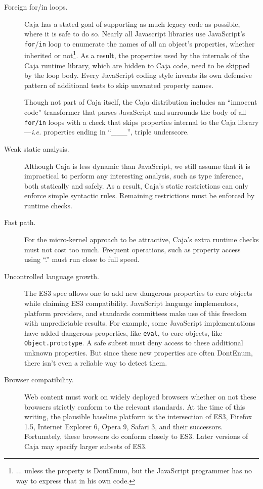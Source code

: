 \documentclass[letterpaper,twocolumn,10pt]{article}
\newcommand{\code}[1]{{\tt {#1}}}              %
\begin{document}
\begin{description}
  \item[Foreign for/in loops.] Caja has a stated goal of supporting as much legacy code as possible, where it
  is safe to do so.  Nearly all Javascript libraries use JavaScript's \code{for}/\code{in} loop to enumerate the names of all an object's 
  properties, whether inherited or not\footnote{
  ... unless the property is DontEnum, but the JavaScript programmer has no way to express that in his own code.
  }. As a result, the properties used by the internals of the Caja runtime library, which are hidden to Caja code, 
  need to be skipped by the loop body. Every JavaScript coding style invents its own defensive pattern of additional 
  tests to skip unwanted property names.
  
  Though not part of Caja itself, the Caja distribution includes an ``innocent code'' transformer that parses JavaScript and
  surrounds the body of all \code{for/in} loops with a check that skips properties internal to the Caja library---\emph{i.e.}
  properties ending in ``\_\_\_'', triple underscore.
    
  \item[Weak static analysis.] Although Caja is less dynamic than JavaScript, we still assume that it is impractical 
  to perform any interesting analysis, such as type inference, both statically and safely. As a result, Caja's static 
  restrictions can only enforce simple syntactic rules. Remaining restrictions must be enforced by runtime checks.
  
  \item[Fast path.] For the micro-kernel approach to be attractive, Caja's extra runtime checks must not cost too 
  much. Frequent operations, such as property access using ``.'' must run close to full speed.
  
  \item[Uncontrolled language growth.] The ES3 spec allows one to add new dangerous properties to core objects while 
  claiming ES3 compatibility. JavaScript language implementors, platform providers, and standards committees make use 
  of this freedom with unpredictable results. For example, some JavaScript implementations have added dangerous 
  properties, like \code{eval}, to core objects, like \code{Object.prototype}. A safe subset must deny access to 
  these additional unknown properties. But since these new properties are often DontEnum, there isn't even a reliable 
  way to detect them.
  
  \item[Browser compatibility.] Web content must work on widely deployed browsers whether on not these browsers 
  strictly conform to the relevant standards. At the time of this writing, the plausible baseline platform is the 
  intersection of ES3, Firefox 1.5, Internet Explorer 6, Opera 9, Safari 3, and their successors. Fortunately, these 
  browsers do conform closely to ES3. Later versions of Caja may specify larger subsets of ES3.
  

\end{description}
\end{document}
